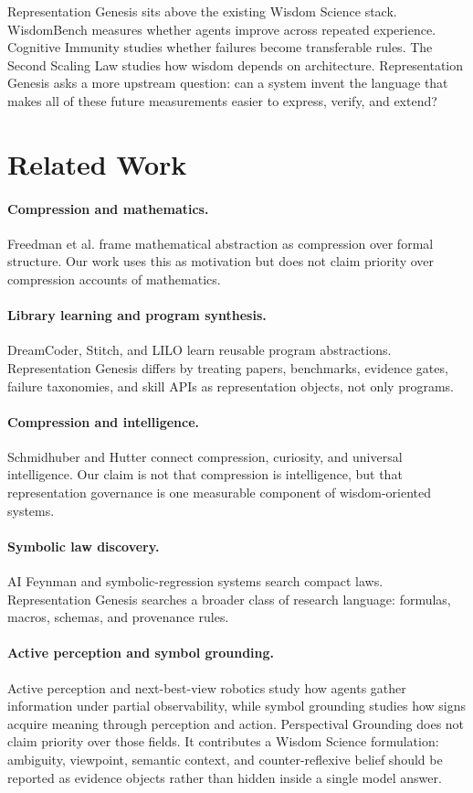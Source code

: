 \documentclass[11pt]{article}
\begin{document}
Representation Genesis sits above the existing Wisdom Science stack.
WisdomBench measures whether agents improve across repeated experience.
Cognitive Immunity studies whether failures become transferable rules.
The Second Scaling Law studies how wisdom depends on architecture.
Representation Genesis asks a more upstream question: can a system invent the language that makes all of these future measurements easier to express, verify, and extend?

\section{Related Work}

\paragraph{Compression and mathematics.}
Freedman et al. frame mathematical abstraction as compression over formal structure.
Our work uses this as motivation but does not claim priority over compression accounts of mathematics.

\paragraph{Library learning and program synthesis.}
DreamCoder, Stitch, and LILO learn reusable program abstractions.
Representation Genesis differs by treating papers, benchmarks, evidence gates, failure taxonomies, and skill APIs as representation objects, not only programs.

\paragraph{Compression and intelligence.}
Schmidhuber and Hutter connect compression, curiosity, and universal intelligence.
Our claim is not that compression is intelligence, but that representation governance is one measurable component of wisdom-oriented systems.

\paragraph{Symbolic law discovery.}
AI Feynman and symbolic-regression systems search compact laws.
Representation Genesis searches a broader class of research language: formulas, macros, schemas, and provenance rules.

\paragraph{Active perception and symbol grounding.}
Active perception and next-best-view robotics study how agents gather information under partial observability, while symbol grounding studies how signs acquire meaning through perception and action.
Perspectival Grounding does not claim priority over those fields.
It contributes a Wisdom Science formulation: ambiguity, viewpoint, semantic context, and counter-reflexive belief should be reported as evidence objects rather than hidden inside a single model answer.
\end{document}
